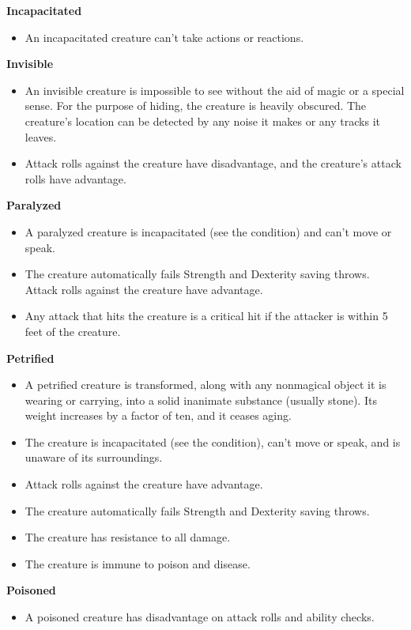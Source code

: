 \documentclass[a4paper,10pt,twoside,twocolumn]{dndbook} %
\begin{document}
\begin{DndSidebar}{}
\begin{itemize}
	\end{itemize}
	\textbf{Incapacitated}
	\begin{itemize}
		\item An incapacitated creature can't take actions or reactions. 
	\end{itemize}
	\textbf{Invisible}
	\begin{itemize}
		\item An invisible creature is impossible to see without the aid of magic or a special sense. For the purpose of hiding, the creature is heavily obscured. The creature's location can be detected by any noise it makes or any tracks it leaves.
		\item Attack rolls against the creature have disadvantage, and the creature's attack rolls have advantage.
	\end{itemize}
	\textbf{Paralyzed}
	\begin{itemize}
		\item A paralyzed creature is incapacitated (see the condition) and can't move or speak.
		\item The creature automatically fails Strength and Dexterity saving throws. Attack rolls against the creature have advantage.
		\item Any attack that hits the creature is a critical hit if the attacker is within 5 feet of the creature.
	\end{itemize}
	\textbf{Petrified}
	\begin{itemize}
		\item A petrified creature is transformed, along with any nonmagical object it is wearing or carrying, into a solid inanimate substance (usually stone). Its weight increases by a factor of ten, and it ceases aging.
		\item The creature is incapacitated (see the condition), can't move or speak, and is unaware of its surroundings.
		\item Attack rolls against the creature have advantage.
		\item The creature automatically fails Strength and Dexterity saving throws.
		\item The creature has resistance to all damage.
		\item The creature is immune to poison and disease.
	\end{itemize}
	\textbf{Poisoned}
	\begin{itemize}
		\item A poisoned creature has disadvantage on attack rolls and ability checks.
	\end{itemize}
	\end{DndSidebar}
\end{document}
